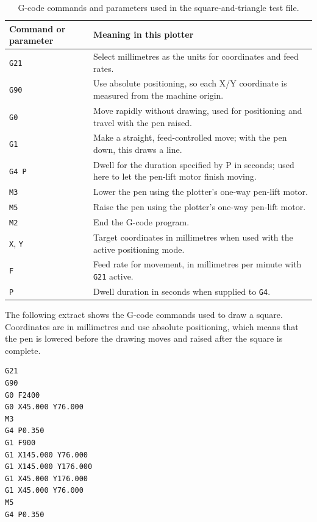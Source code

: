 \begin{table}[!htbp]
    \centering
    \begin{tabularx}{\linewidth}{|l|X|}
        \hline
        \textbf{Command or parameter} & \textbf{Meaning in this plotter} \\
        \hline
        \texttt{G21} & Select millimetres as the units for coordinates and feed rates. \\
        \hline
        \texttt{G90} & Use absolute positioning, so each X/Y coordinate is measured from the machine origin. \\
        \hline
        \texttt{G0} & Move rapidly without drawing, used for positioning and travel with the pen raised. \\
        \hline
        \texttt{G1} & Make a straight, feed-controlled move; with the pen down, this draws a line. \\
        \hline
        \texttt{G4 P} & Dwell for the duration specified by P in seconds; used here to let the pen-lift motor finish moving. \\
        \hline
        \texttt{M3} & Lower the pen using the plotter's one-way pen-lift motor. \\
        \hline
        \texttt{M5} & Raise the pen using the plotter's one-way pen-lift motor. \\
        \hline
        \texttt{M2} & End the G-code program. \\
        \hline
        \texttt{X}, \texttt{Y} & Target coordinates in millimetres when used with the active positioning mode. \\
        \hline
        \texttt{F} & Feed rate for movement, in millimetres per minute with \texttt{G21} active. \\
        \hline
        \texttt{P} & Dwell duration in seconds when supplied to \texttt{G4}. \\
        \hline
    \end{tabularx}
    \caption{G-code commands and parameters used in the square-and-triangle test file.}
    \label{tab:gcode-command-meanings}
\end{table}

The following extract shows the G-code commands used to draw a square. Coordinates are in millimetres and use absolute positioning, which means that the pen is lowered before the drawing moves and raised after the square is complete.

\begin{verbatim}
G21
G90
G0 F2400
G0 X45.000 Y76.000
M3
G4 P0.350
G1 F900
G1 X145.000 Y76.000
G1 X145.000 Y176.000
G1 X45.000 Y176.000
G1 X45.000 Y76.000
M5
G4 P0.350
\end{verbatim}

